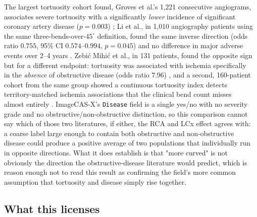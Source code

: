 The largest tortuosity cohort found, Groves et al.'s 1,221 consecutive angiograms, associates
severe tortuosity with a significantly \emph{lower} incidence of significant coronary artery
disease ($p=0.003$) \cite{groves2009tortuosity}; Li et al., in 1,010 angiography patients using the
same three-bends-over-$45^\circ$ definition, found the same inverse direction (odds ratio $0.755$,
95\% CI $0.574$--$0.994$, $p=0.045$) and no difference in major adverse events over 2--4 years
\cite{li2011tortuosity}. Zebić Mihić et al., in 131 patients, found the opposite sign but for a
different endpoint: tortuosity was associated with ischemia specifically in the \emph{absence} of
obstructive disease (odds ratio $7.96$) \cite{zebicmihic2023tortuosity}, and a second, 160-patient
cohort from the same group showed a continuous tortuosity index detects territory-matched ischemia
associations that the clinical bend count misses almost entirely
\cite{zebicmihic2024index}. ImageCAS-X's \texttt{Disease} field is a single yes/no with no severity
grade and no obstructive/non-obstructive distinction, so this comparison cannot say which of those
two literatures, if either, the RCA and LCx effect agrees with: a coarse label large enough to
contain both obstructive and non-obstructive disease could produce a positive average of two
populations that individually run in opposite directions. What it does establish is that "more
curved" is not obviously the direction the obstructive-disease literature would predict, which is
reason enough not to read this result as confirming the field's more common assumption that
tortuosity and disease simply rise together.

\subsection*{What this licenses}

